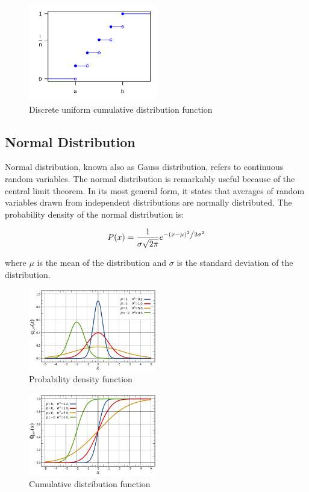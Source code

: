 \begin{figure}[H]
  \centering
  \includegraphics[width=0.5\textwidth]{figures/uniform_2.png}
  \caption{Discrete uniform cumulative distribution function}
\end{figure}

\subsection{Normal Distribution}

Normal distribution, known also as Gauss distribution, refers to continuous random variables. 
The normal distribution is remarkably useful because of the central limit theorem. In its most general form, it states that averages of random variables 
drawn from independent distributions are normally distributed. The probability density of the normal distribution is:

\[P(x) = \frac{1}{{\sigma \sqrt {2\pi } }}e^{{{ - \left( {x - \mu } \right)^2 } \mathord{\left/ {\vphantom {{ - \left( {x - \mu } \right)^2 } {2\sigma ^2 }}} \right. \kern-\nulldelimiterspace} {2\sigma ^2 }}}\]

where \(\mu\) is the mean of the distribution and \(\sigma\) is the standard deviation of the distribution.

\begin{figure}[H]
  \centering
  \includegraphics[width=0.5\textwidth]{figures/gauss_1.png}
  \caption{Probability density function}
\end{figure}

\begin{figure}[H]
  \centering
  \includegraphics[width=0.5\textwidth]{figures/gauss_2.png}
  \caption{Cumulative distribution function}
\end{figure}

